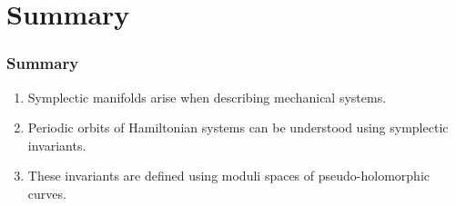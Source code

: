 \section*{Summary}
\begin{frame}
  \frametitle{Summary}
  \begin{enumerate}
    \item Symplectic manifolds arise when describing mechanical systems.
    \item Periodic orbits of Hamiltonian systems can be understood using symplectic invariants.
    \item These invariants are defined using moduli spaces of pseudo-holomorphic curves.
  \end{enumerate}
  \pause
  \vspace{2\baselineskip}{\LARGE Thanks for listening! Any questions?}
\end{frame}
